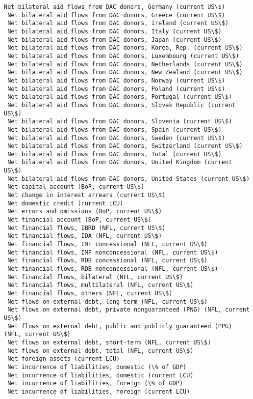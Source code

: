 \documentclass[11pt]{article}
\begin{document}
\begin{Verbatim}[commandchars=\\\{\}]
 Net bilateral aid flows from DAC donors, Germany (current US\$)
 Net bilateral aid flows from DAC donors, Greece (current US\$)
 Net bilateral aid flows from DAC donors, Ireland (current US\$)
 Net bilateral aid flows from DAC donors, Italy (current US\$)
 Net bilateral aid flows from DAC donors, Japan (current US\$)
 Net bilateral aid flows from DAC donors, Korea, Rep. (current US\$)
 Net bilateral aid flows from DAC donors, Luxembourg (current US\$)
 Net bilateral aid flows from DAC donors, Netherlands (current US\$)
 Net bilateral aid flows from DAC donors, New Zealand (current US\$)
 Net bilateral aid flows from DAC donors, Norway (current US\$)
 Net bilateral aid flows from DAC donors, Poland (current US\$)
 Net bilateral aid flows from DAC donors, Portugal (current US\$)
 Net bilateral aid flows from DAC donors, Slovak Republic (current US\$)
 Net bilateral aid flows from DAC donors, Slovenia (current US\$)
 Net bilateral aid flows from DAC donors, Spain (current US\$)
 Net bilateral aid flows from DAC donors, Sweden (current US\$)
 Net bilateral aid flows from DAC donors, Switzerland (current US\$)
 Net bilateral aid flows from DAC donors, Total (current US\$)
 Net bilateral aid flows from DAC donors, United Kingdom (current US\$)
 Net bilateral aid flows from DAC donors, United States (current US\$)
 Net capital account (BoP, current US\$)
 Net change in interest arrears (current US\$)
 Net domestic credit (current LCU)
 Net errors and omissions (BoP, current US\$)
 Net financial account (BoP, current US\$)
 Net financial flows, IBRD (NFL, current US\$)
 Net financial flows, IDA (NFL, current US\$)
 Net financial flows, IMF concessional (NFL, current US\$)
 Net financial flows, IMF nonconcessional (NFL, current US\$)
 Net financial flows, RDB concessional (NFL, current US\$)
 Net financial flows, RDB nonconcessional (NFL, current US\$)
 Net financial flows, bilateral (NFL, current US\$)
 Net financial flows, multilateral (NFL, current US\$)
 Net financial flows, others (NFL, current US\$)
 Net flows on external debt, long-term (NFL, current US\$)
 Net flows on external debt, private nonguaranteed (PNG) (NFL, current US\$)
 Net flows on external debt, public and publicly guaranteed (PPG) (NFL, current US\$)
 Net flows on external debt, short-term (NFL, current US\$)
 Net flows on external debt, total (NFL, current US\$)
 Net foreign assets (current LCU)
 Net incurrence of liabilities, domestic (\% of GDP)
 Net incurrence of liabilities, domestic (current LCU)
 Net incurrence of liabilities, foreign (\% of GDP)
 Net incurrence of liabilities, foreign (current LCU)

\end{Verbatim}
\end{document}
